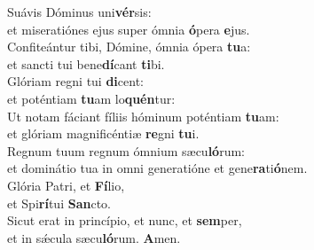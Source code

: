 \evenverse Suávis Dóminus uni\textbf{vér}sis:~\*\\
\evenverse et miseratiónes ejus super ómnia \textbf{ó}pera \textbf{e}jus.\\
\oddverse Confiteántur tibi, Dómine, ómnia ópera \textbf{tu}a:~\*\\
\oddverse et sancti tui bene\textbf{dí}cant \textbf{ti}bi.\\
\evenverse Glóriam regni tui \textbf{di}cent:~\*\\
\evenverse et poténtiam \textbf{tu}am lo\textbf{quén}tur:\\
\oddverse Ut notam fáciant fíliis hóminum poténtiam \textbf{tu}am:~\*\\
\oddverse et glóriam magnificéntiæ \textbf{re}gni \textbf{tu}i.\\
\evenverse Regnum tuum regnum ómnium sæcu\textbf{ló}rum:~\*\\
\evenverse et dominátio tua in omni generatióne et gene\textbf{ra}ti\textbf{ó}nem.\\
\oddverse Glória Patri, et \textbf{Fí}lio,~\*\\
\oddverse et Spi\textbf{rí}tui \textbf{San}cto.\\
\evenverse Sicut erat in princípio, et nunc, et \textbf{sem}per,~\*\\
\evenverse et in sǽcula sæcu\textbf{ló}rum. \textbf{A}men.\\
